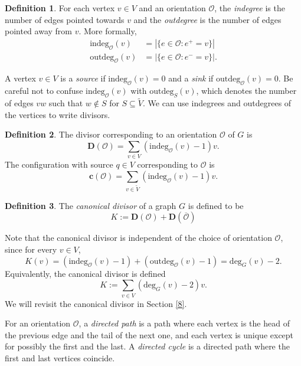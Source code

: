 \documentclass[openany, amssymb, psamsfonts]{amsart}
\theoremstyle{definition}
\newtheorem{defn}{Definition}[section]
\numberwithin{equation}{section}
\begin{document}
\begin{defn}
\label{defn 7.1}
For each vertex $v\in V$ and an orientation $\mathcal{O}$, the \textit{indegree} is the number of edges pointed towards $v$ and the \textit{outdegree} is the number of edges pointed away from $v$. More formally,
\begin{align*}
    \text{indeg}_{\mathcal{O}}(v)&=|\{e\in \mathcal{O}:e^+=v\}|\\
    \text{outdeg}_{\mathcal{O}}(v)&=|\{e\in \mathcal{O}:e^-=v\}|.
\end{align*}
\end{defn}

A vertex $v\in V$ is a \textit{source} if $\text{indeg}_{\mathcal{O}}(v)=0$ and a \textit{sink} if $\text{outdeg}_{\mathcal{O}}(v)=0$. Be careful not to confuse $\text{indeg}_{\mathcal{O}}(v)$ with $\text{outdeg}_S(v)$, which denotes the number of edges $vw$ such that $w\notin S$ for $S\subseteq \tilde{V}$. We can use indegrees and outdegrees of the vertices to write divisors.

\begin{defn}
\label{defn 7.2}
The divisor corresponding to an orientation $\mathcal{O}$ of $G$ is 
\[\textbf{D}(\mathcal{O})=\sum_{v\in V}(\text{indeg}_{\mathcal{O}}(v)-1)v.\]
The configuration with source $q\in V$ corresponding to $\mathcal{O}$ is
\[\textbf{c}(\mathcal{O})=\sum_{v\in \tilde{V}}(\text{indeg}_{\mathcal{O}}(v)-1)v.\]
\end{defn}

\begin{defn}
\label{defn 7.3}
The \textit{canonical divisor} of a graph $G$ is defined to be 
\[K:=\mathbf{D}(\mathcal{O})+\mathbf{D}(\overline{\mathcal{O}})\]
\end{defn}

Note that the canonical divisor is independent of the choice of orientation $\mathcal{O}$, since for every $v\in V$, 
\[K(v)=(\text{indeg}_{\mathcal{O}}(v)-1)+(\text{outdeg}_{\mathcal{O}}(v)-1)=\text{deg}_{G}(v)-2.\]
Equivalently, the canonical divisor is defined
\[K:=\sum_{v\in V} (\text{deg}_G(v)-2)v.\]
We will revisit the canonical divisor in Section \ref{8}.

For an orientation $\mathcal{O}$, a \textit{directed path} is a path where each vertex is the head of the previous edge and the tail of the next one, and each vertex is unique except for possibly the first and the last. A \textit{directed cycle} is a directed path where the first and last vertices coincide.
\end{document}
